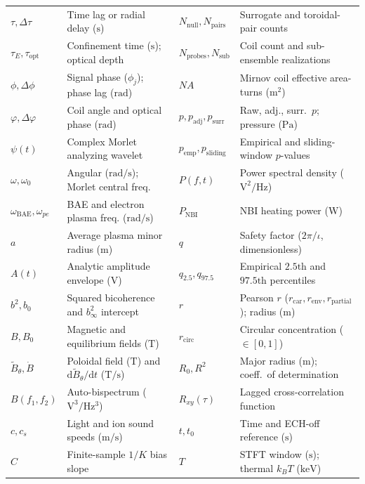 \documentclass[12pt]{article}
\begin{document}
{\begin{tabularx}{\textwidth}{@{}l >{\raggedright\arraybackslash}X l >{\raggedright\arraybackslash}X@{}}
$\tau, \Delta\tau$ & Time lag or radial delay ($\mathrm{s}$) & $N_{\mathrm{null}}, N_{\mathrm{pairs}}$ & Surrogate and toroidal-pair counts \\
$\tau_E, \tau_{\mathrm{opt}}$ & Confinement time ($\mathrm{s}$); optical depth & $N_{\mathrm{probes}}, N_{\mathrm{sub}}$ & Coil count and sub-ensemble realizations \\
$\phi, \Delta\phi$ & Signal phase ($\phi_j$); phase lag ($\mathrm{rad}$) & $N A$ & Mirnov coil effective area-turns ($\mathrm{m^2}$) \\
$\varphi, \Delta\varphi$ & Coil angle and optical phase ($\mathrm{rad}$) & $p, p_{\mathrm{adj}}, p_{\mathrm{surr}}$ & Raw, adj., surr.\ $p$; pressure ($\mathrm{Pa}$) \\
$\psi(t)$ & Complex Morlet analyzing wavelet & $p_{\mathrm{emp}}, p_{\mathrm{sliding}}$ & Empirical and sliding-window $p$-values \\
$\omega, \omega_0$ & Angular ($\mathrm{rad/s}$); Morlet central freq. & $P(f, t)$ & Power spectral density ($\mathrm{V^2/Hz}$) \\
$\omega_{\mathrm{BAE}}, \omega_{pe}$ & BAE and electron plasma freq. ($\mathrm{rad/s}$) & $P_{\mathrm{NBI}}$ & NBI heating power ($\mathrm{W}$) \\
$a$ & Average plasma minor radius ($\mathrm{m}$) & $q$ & Safety factor ($2\pi/\iota$, dimensionless) \\
$A(t)$ & Analytic amplitude envelope ($\mathrm{V}$) & $q_{2.5}, q_{97.5}$ & Empirical $2.5\text{th}$ and $97.5\text{th}$ percentiles \\
$b^2, b_0$ & Squared bicoherence and $b^2_\infty$ intercept & $r$ & Pearson $r$ ($r_{\mathrm{car}}, r_{\mathrm{env}}, r_{\mathrm{partial}}$); radius ($\mathrm{m}$) \\
$B, B_0$ & Magnetic and equilibrium fields ($\mathrm{T}$) & $r_{\mathrm{circ}}$ & Circular concentration ($\in [0, 1]$) \\
$\tilde{B}_\theta, \dot{B}$ & Poloidal field ($\mathrm{T}$) and $\mathrm{d}\tilde{B}_\theta/\mathrm{d}t$ ($\mathrm{T/s}$) & $R_0, R^2$ & Major radius ($\mathrm{m}$); coeff.\ of determination \\
$B(f_1, f_2)$ & Auto-bispectrum ($\mathrm{V^3/Hz^3}$) & $R_{xy}(\tau)$ & Lagged cross-correlation function \\
$c, c_s$ & Light and ion sound speeds ($\mathrm{m/s}$) & $t, t_0$ & Time and ECH-off reference ($\mathrm{s}$) \\
$C$ & Finite-sample $1/K$ bias slope & $T$ & STFT window ($\mathrm{s}$); thermal $k_B T$ ($\mathrm{keV}$) \\

\end{tabularx}}
\end{document}
